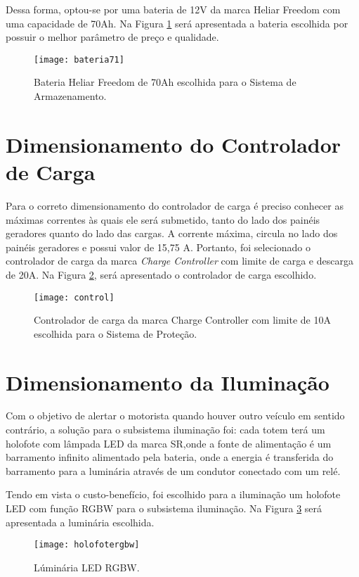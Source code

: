 Dessa forma, optou-se por uma bateria de 12V da marca Heliar Freedom com uma capacidade de 70Ah. Na Figura \ref{fig:bateria71} será apresentada a bateria escolhida por possuir o melhor parâmetro de preço e qualidade.


\begin{figure}[H]
\centering
\texttt{[image: bateria71]}
\caption{Bateria Heliar Freedom de 70Ah escolhida para o Sistema de Armazenamento.}
\label{fig:bateria71}
\end{figure}
\FloatBarrier

\section{Dimensionamento do Controlador de Carga}

Para o correto dimensionamento do controlador de carga é preciso conhecer as máximas correntes às quais ele será submetido, tanto do lado dos painéis geradores quanto do lado das cargas. A corrente máxima, circula no lado dos painéis geradores e possui valor de 15,75 A. Portanto, foi selecionado o controlador de carga da marca \textit{Charge Controller} com limite de carga e descarga de 20A. Na Figura \ref{fig:control}, será apresentado o controlador de carga escolhido.

\begin{figure}[H]
\centering
\texttt{[image: control]}
    \caption{Controlador de carga da marca Charge Controller com limite de 10A escolhida para o Sistema de Proteção.}
\label{fig:control}
\end{figure}
\FloatBarrier

\section{Dimensionamento da Iluminação}

Com o objetivo de alertar o motorista quando houver outro veículo em sentido contrário, a solução para o subsistema iluminação foi: cada totem terá um holofote com lâmpada LED da marca SR,onde a fonte de alimentação é um barramento infinito alimentado pela bateria, onde a energia é transferida do barramento para a luminária através de um condutor conectado com um relé. 

Tendo em vista o custo-benefício, foi escolhido para a iluminação um holofote LED com função RGBW para o subsistema iluminação. Na Figura \ref{fig:holofotergbw} será apresentada a luminária escolhida.

    \begin{figure}[h!]
\centering
\texttt{[image: holofotergbw]}
\caption{Lúminária LED RGBW.}
\label{fig:holofotergbw}
\end{figure}



